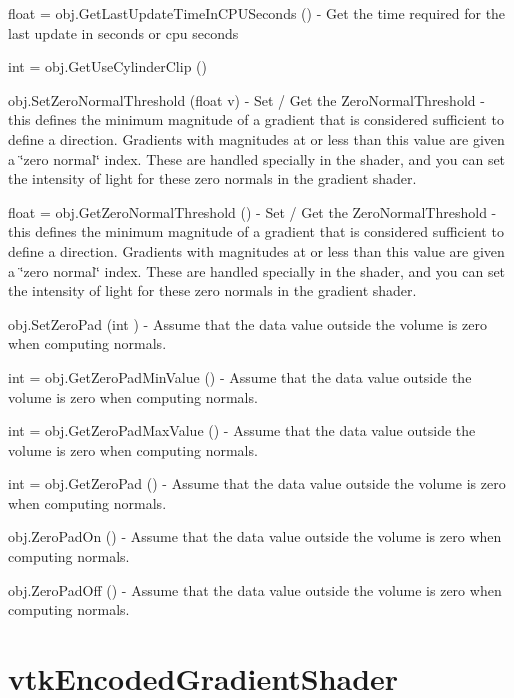 \begin{DoxyItemize}
\item {\ttfamily float = obj.\-Get\-Last\-Update\-Time\-In\-C\-P\-U\-Seconds ()} -\/ Get the time required for the last update in seconds or cpu seconds  
\item {\ttfamily int = obj.\-Get\-Use\-Cylinder\-Clip ()}  
\item {\ttfamily obj.\-Set\-Zero\-Normal\-Threshold (float v)} -\/ Set / Get the Zero\-Normal\-Threshold -\/ this defines the minimum magnitude of a gradient that is considered sufficient to define a direction. Gradients with magnitudes at or less than this value are given a \char`\"{}zero normal\char`\"{} index. These are handled specially in the shader, and you can set the intensity of light for these zero normals in the gradient shader.  
\item {\ttfamily float = obj.\-Get\-Zero\-Normal\-Threshold ()} -\/ Set / Get the Zero\-Normal\-Threshold -\/ this defines the minimum magnitude of a gradient that is considered sufficient to define a direction. Gradients with magnitudes at or less than this value are given a \char`\"{}zero normal\char`\"{} index. These are handled specially in the shader, and you can set the intensity of light for these zero normals in the gradient shader.  
\item {\ttfamily obj.\-Set\-Zero\-Pad (int )} -\/ Assume that the data value outside the volume is zero when computing normals.  
\item {\ttfamily int = obj.\-Get\-Zero\-Pad\-Min\-Value ()} -\/ Assume that the data value outside the volume is zero when computing normals.  
\item {\ttfamily int = obj.\-Get\-Zero\-Pad\-Max\-Value ()} -\/ Assume that the data value outside the volume is zero when computing normals.  
\item {\ttfamily int = obj.\-Get\-Zero\-Pad ()} -\/ Assume that the data value outside the volume is zero when computing normals.  
\item {\ttfamily obj.\-Zero\-Pad\-On ()} -\/ Assume that the data value outside the volume is zero when computing normals.  
\item {\ttfamily obj.\-Zero\-Pad\-Off ()} -\/ Assume that the data value outside the volume is zero when computing normals.  
\end{DoxyItemize}\hypertarget{vtkvolumerendering_vtkencodedgradientshader}{}\section{vtk\-Encoded\-Gradient\-Shader}\label{vtkvolumerendering_vtkencodedgradientshader}
